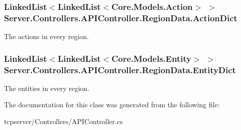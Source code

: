 \subsubsection[{Action\+Dict}]{\setlength{\rightskip}{0pt plus 5cm}Linked\+List$<$Linked\+List$<${\bf Core.\+Models.\+Action}$>$ $>$ Server.\+Controllers.\+A\+P\+I\+Controller.\+Region\+Data.\+Action\+Dict}\label{classServer_1_1Controllers_1_1APIController_1_1RegionData_a15b7109e6735a6e66ed251c195aaf937}


The actions in every region. 

\hypertarget{classServer_1_1Controllers_1_1APIController_1_1RegionData_a515c8be86ead173ab0e21c57a93cd174}{}
\subsubsection[{Entity\+Dict}]{\setlength{\rightskip}{0pt plus 5cm}Linked\+List$<$Linked\+List$<${\bf Core.\+Models.\+Entity}$>$ $>$ Server.\+Controllers.\+A\+P\+I\+Controller.\+Region\+Data.\+Entity\+Dict}\label{classServer_1_1Controllers_1_1APIController_1_1RegionData_a515c8be86ead173ab0e21c57a93cd174}


The entities in every region. 



The documentation for this class was generated from the following file\+:\begin{DoxyCompactItemize}
\item 
tcpserver/\+Controllers/A\+P\+I\+Controller.\+cs\end{DoxyCompactItemize}
